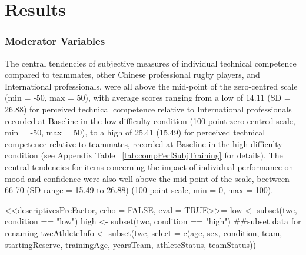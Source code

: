 \section{\label{app6:results}Results}
















%
%
%


\subsubsection{Moderator Variables}

The central tendencies of subjective measures of individual technical competence compared to teammates, other Chinese professional rugby players, and International professionals, were all above the mid-point of the zero-centred scale (min = -50, max = 50), with average scores ranging from  a low of 14.11 (SD = 26.88) for perceived technical competence relative to International professionals recorded at Baseline in the low difficulty condition (100 point zero-centred scale, min = -50, max = 50), to a high of 25.41 (15.49) for perceived technical competence relative to teammates, recorded at Baseline in the high-difficulty condition (see Appendix Table ~\ref{tab:compPerfSubjTraining} for details).  The central tendencies for items concerning the impact of individual performance on mood and confidence were also well above the mid-point of the scale, beetween 66-70 (SD range = 15.49 to 26.88) (100 point scale, min = 0, max = 100).




<<descriptivesPreFactor, echo = FALSE, eval = TRUE>>=
low <- subset(twc, condition == "low")
high <- subset(twc, condition == "high")
##subset data for renaming
twcAthleteInfo <- subset(twc, select = c(age, sex, condition, team, startingReserve,
                                    trainingAge, yearsTeam, athleteStatus, teamStatus))

